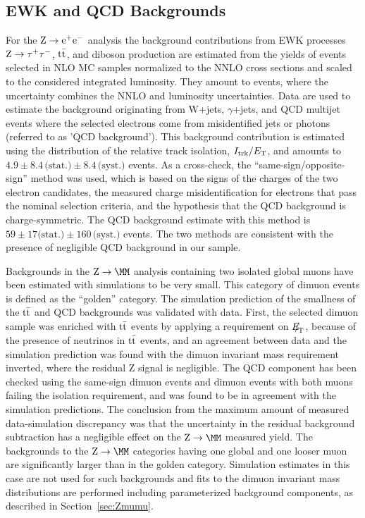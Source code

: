 \subsection{EWK and QCD Backgrounds}
\label{sec:bkgZll}

For the $\mathrm{Z} \rightarrow \mathrm{e}^+\mathrm{e}^-$ analysis the background contributions from EWK processes $\mathrm{Z} \rightarrow \tau^+\tau^-$, $\mathrm{t}\bar{\mathrm{t}}$,
and diboson production are estimated from the yields of events selected in NLO MC samples
normalized to the NNLO cross sections and scaled to the considered integrated luminosity.
They amount to \ZEEEWKBKG events, where the uncertainty combines the NNLO
and luminosity uncertainties. Data are used to estimate the background
originating from W+jets, $\gamma$+jets, and QCD multijet events where the
selected electrons come from misidentified jets or photons
(referred to as 'QCD background').
This background contribution is estimated using the distribution
of the relative track isolation, $I_{\textrm{trk}}/E\,\,_{\!\!\!\mathrm{T}}$,
and amounts to $4.9 \pm 8.4\, \textrm{(stat.)} \pm 8.4\, \textrm{(syst.)}$ events.
As a cross-check, the ``same-sign/opposite-sign'' method was used,
which is based on the signs of the charges of the two electron candidates, the measured
charge misidentification for electrons that pass the nominal selection criteria, and the
hypothesis that the QCD background is charge-symmetric.
The QCD background estimate with this method is $59 \pm 17
\textrm{(stat.)} \pm 160\, \textrm{(syst.)}$ events.
The two methods are consistent with the presence of negligible QCD background in our sample.

Backgrounds in the $\Zmm$ analysis containing two isolated global muons
have been estimated with simulations to be very small.
This category of dimuon events is defined as the ``golden'' category.
The simulation prediction of the smallness of the $\mathrm{t}\bar{\mathrm{t}}$ and QCD backgrounds was validated with data.
First, the selected dimuon sample was enriched with $\mathrm{t}\bar{\mathrm{t}}$ events by applying
a requirement on ${E\!\!\!/}_{\!\mathrm{T}}$, because of the presence of neutrinos in $\mathrm{t}\bar{\mathrm{t}}$ events,
and an agreement between data and the simulation prediction was found
with the dimuon invariant mass requirement inverted,
where the residual Z signal is negligible.
The QCD component has been checked using the same-sign dimuon events and dimuon events with
both muons failing the isolation requirement, and was found to be in agreement with the simulation predictions.
The conclusion from the maximum amount of measured data-simulation discrepancy
was that the uncertainty in the residual background subtraction
has a negligible effect on the $\Zmm$ measured yield.
The backgrounds to the $\Zmm$ categories having one global and one looser muon
are significantly larger than in the golden category.
Simulation estimates in this case are not used for such backgrounds and
fits to the dimuon invariant mass
distributions are performed including parameterized background components, as
described in Section~\ref{sec:Zmumu}.

